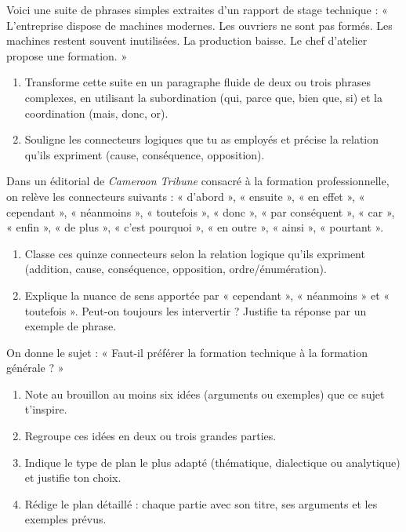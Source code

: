 \documentclass[11pt]{article}
\begin{document}
\begin{exercice}
Voici une suite de phrases simples extraites d'un rapport de stage technique : « L'entreprise dispose de machines modernes. Les ouvriers ne sont pas formés. Les machines restent souvent inutilisées. La production baisse. Le chef d'atelier propose une formation. »
\begin{enumerate}
\item Transforme cette suite en un paragraphe fluide de deux ou trois phrases complexes, en utilisant la subordination (qui, parce que, bien que, si) et la coordination (mais, donc, or).
\item Souligne les connecteurs logiques que tu as employés et précise la relation qu'ils expriment (cause, conséquence, opposition).
\end{enumerate}
\end{exercice}

\begin{exercice}
Dans un éditorial de \emph{Cameroon Tribune} consacré à la formation professionnelle, on relève les connecteurs suivants : « d'abord », « ensuite », « en effet », « cependant », « néanmoins », « toutefois », « donc », « par conséquent », « car », « enfin », « de plus », « c'est pourquoi », « en outre », « ainsi », « pourtant ».
\begin{enumerate}
\item Classe ces quinze connecteurs selon la relation logique qu'ils expriment (addition, cause, conséquence, opposition, ordre/énumération).
\item Explique la nuance de sens apportée par « cependant », « néanmoins » et « toutefois ». Peut-on toujours les intervertir ? Justifie ta réponse par un exemple de phrase.
\end{enumerate}
\end{exercice}

\begin{exercice}
On donne le sujet : « Faut-il préférer la formation technique à la formation générale ? »
\begin{enumerate}
\item Note au brouillon au moins six idées (arguments ou exemples) que ce sujet t'inspire.
\item Regroupe ces idées en deux ou trois grandes parties.
\item Indique le type de plan le plus adapté (thématique, dialectique ou analytique) et justifie ton choix.
\item Rédige le plan détaillé : chaque partie avec son titre, ses arguments et les exemples prévus.
\end{enumerate}
\end{exercice}
\end{document}
